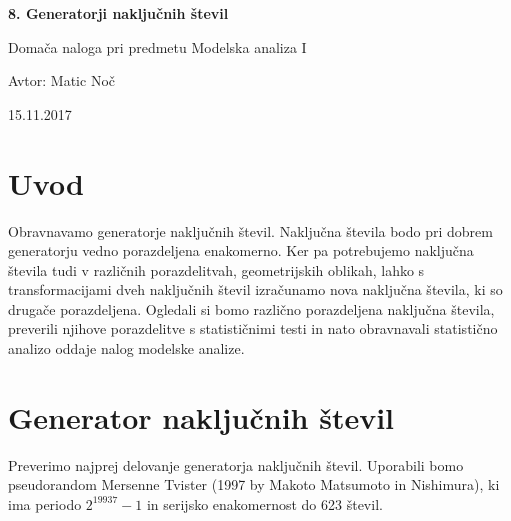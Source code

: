 \documentclass[11pt, a4paper]{article}
\begin{document}
    \begin{center}
    {\LARGE\bfseries 8. Generatorji naključnih števil \par}
    \vspace{1cm}
    
    {\Large Domača naloga pri predmetu Modelska analiza I\par}
    \vspace{0.2cm}
    {\normalsize Avtor: Matic Noč \par}
    \vspace{0.2cm}    
    {\normalsize 15.11.2017 \par}    

    
    \end{center}
\section{Uvod}
Obravnavamo generatorje naključnih števil. Naključna števila bodo pri dobrem generatorju vedno porazdeljena enakomerno. Ker pa potrebujemo naključna števila tudi v različnih porazdelitvah, geometrijskih oblikah, lahko s transformacijami dveh naključnih števil izračunamo nova naključna števila, ki so drugače porazdeljena. Ogledali si bomo različno porazdeljena naključna števila, preverili njihove porazdelitve s statističnimi testi in nato obravnavali statistično analizo oddaje nalog modelske analize.


\section{Generator naključnih števil}
Preverimo najprej delovanje generatorja naključnih števil. Uporabili bomo pseudorandom Mersenne Tvister (1997 by Makoto Matsumoto in Nishimura), ki ima periodo  $2^{19937} - 1$ in serijsko enakomernost do 623 števil.
\end{document}
